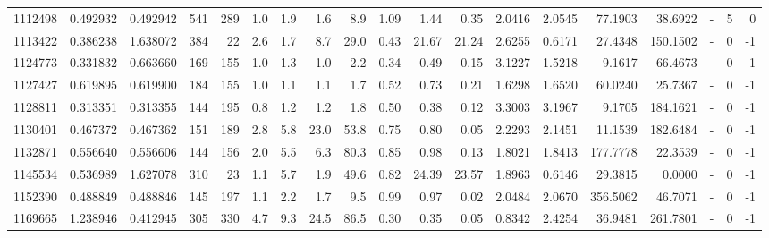 \begin{tabular}{rrrrrrrrrrrrrrrrlrr}
   1112498 & 0.492932 &   0.492942 &  541 &  289 &      1.0 &      1.9 &     1.6 &      8.9 &       1.09 &        1.44 &        0.35 &  2.0416 &  2.0545 &   77.1903 &   38.6922 &             - &        5 &          0 \\
   1113422 & 0.386238 &   1.638072 &  384 &   22 &      2.6 &      1.7 &     8.7 &     29.0 &       0.43 &       21.67 &       21.24 &  2.6255 &  0.6171 &   27.4348 &  150.1502 &             - &        0 &         -1 \\
   1124773 & 0.331832 &   0.663660 &  169 &  155 &      1.0 &      1.3 &     1.0 &      2.2 &       0.34 &        0.49 &        0.15 &  3.1227 &  1.5218 &    9.1617 &   66.4673 &             - &        0 &         -1 \\
   1127427 & 0.619895 &   0.619900 &  184 &  155 &      1.0 &      1.1 &     1.1 &      1.7 &       0.52 &        0.73 &        0.21 &  1.6298 &  1.6520 &   60.0240 &   25.7367 &             - &        0 &         -1 \\
   1128811 & 0.313351 &   0.313355 &  144 &  195 &      0.8 &      1.2 &     1.2 &      1.8 &       0.50 &        0.38 &        0.12 &  3.3003 &  3.1967 &    9.1705 &  184.1621 &             - &        0 &         -1 \\
   1130401 & 0.467372 &   0.467362 &  151 &  189 &      2.8 &      5.8 &    23.0 &     53.8 &       0.75 &        0.80 &        0.05 &  2.2293 &  2.1451 &   11.1539 &  182.6484 &             - &        0 &         -1 \\
   1132871 & 0.556640 &   0.556606 &  144 &  156 &      2.0 &      5.5 &     6.3 &     80.3 &       0.85 &        0.98 &        0.13 &  1.8021 &  1.8413 &  177.7778 &   22.3539 &             - &        0 &         -1 \\
   1145534 & 0.536989 &   1.627078 &  310 &   23 &      1.1 &      5.7 &     1.9 &     49.6 &       0.82 &       24.39 &       23.57 &  1.8963 &  0.6146 &   29.3815 &    0.0000 &             - &        0 &         -1 \\
   1152390 & 0.488849 &   0.488846 &  145 &  197 &      1.1 &      2.2 &     1.7 &      9.5 &       0.99 &        0.97 &        0.02 &  2.0484 &  2.0670 &  356.5062 &   46.7071 &             - &        0 &         -1 \\
   1169665 & 1.238946 &   0.412945 &  305 &  330 &      4.7 &      9.3 &    24.5 &     86.5 &       0.30 &        0.35 &        0.05 &  0.8342 &  2.4254 &   36.9481 &  261.7801 &             - &        0 &         -1 \\

\end{tabular}
